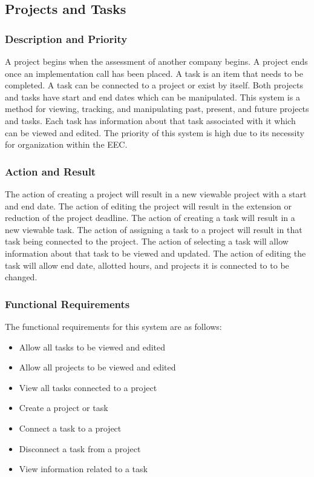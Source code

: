 \documentclass[letterpaper,10pt,titlepage,journal,compsoc,draftclsnofoot,onecolumn]{IEEEtran}
\begin{document}
\subsection{Projects and Tasks}

\subsubsection{Description and Priority}

A project begins when the assessment of another company begins. A project ends once an implementation call has been placed. A task is an item that needs to be completed. A task can be connected to a project or exist by itself. Both projects and tasks have start and end dates which can be manipulated. This system is a method for viewing, tracking, and manipulating past, present, and future projects and tasks. Each task has information about that task associated with it which can be viewed and edited. The priority of this system is high due to its necessity for organization within the EEC.

\subsubsection{Action and Result}

The action of creating a project will result in a new viewable project with a start and end date. The action of editing the project will result in the extension or reduction of the project deadline. The action of creating a task will result in a new viewable task. The action of assigning a task to a project will result in that task being connected to the project. The action of selecting a task will allow information about that task to be viewed and updated. The action of editing the task will allow end date, allotted hours, and projects it is connected to to be changed.

\subsubsection{Functional Requirements}

The functional requirements for this system are as follows:
\begin{itemize}
\item Allow all tasks to be viewed and edited
\item Allow all projects to be viewed and edited
\item View all tasks connected to a project
\item Create a project or task
\item Connect a task to a project
\item Disconnect a task from a project
\item View information related to a task	
\end{itemize}
\end{document}
